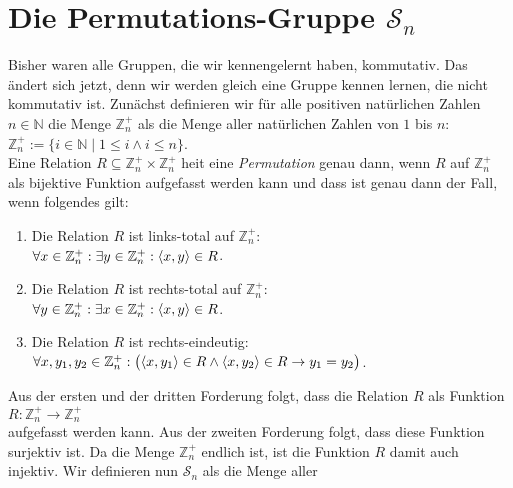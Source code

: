\section{Die Permutations-Gruppe $\mathcal{S}_n$}
Bisher waren alle Gruppen, die wir kennengelernt haben, kommutativ.  Das \"{a}ndert sich jetzt, denn wir
werden gleich eine Gruppe kennen lernen, die nicht kommutativ ist.  Zun\"{a}chst definieren wir f\"{u}r alle
positiven nat\"{u}rlichen Zahlen $n \in \mathbb{N}$ die Menge $\mathbb{Z}_n^+$ als die Menge aller nat\"{u}rlichen Zahlen
von $1$ bis $n$:
\\[0.2cm]
\hspace*{1.3cm}
$\mathbb{Z}_n^+ := \{ i \in \mathbb{N} \mid 1 \leq i \wedge i \leq n \}$.
\\[0.2cm]
Eine Relation $R \subseteq \mathbb{Z}_n^+ \times \mathbb{Z}_n^+$ hei\3t eine \emph{Permutation} genau dann, wenn $R$ auf $\mathbb{Z}_n^+$
als bijektive Funktion aufgefasst werden kann und dass ist genau dann der Fall, wenn folgendes gilt:
\begin{enumerate}
\item Die Relation $R$ ist links-total auf $\mathbb{Z}_n^+$:
      \\[0.2cm]
      \hspace*{1.3cm}
      $\forall x \in \mathbb{Z}_n^+: \exists y \in \mathbb{Z}_n^+: \pair(x,y) \in R$.
\item Die Relation $R$ ist rechts-total auf $\mathbb{Z}_n^+$:
      \\[0.2cm]
      \hspace*{1.3cm}
      $\forall y \in \mathbb{Z}_n^+: \exists x \in \mathbb{Z}_n^+: \pair(x,y) \in R$.
\item Die Relation $R$ ist rechts-eindeutig:
      \\[0.2cm]
      \hspace*{1.3cm}
      $\forall x, y_1, y_2 \in \mathbb{Z}_n^+:\bigl(\pair(x,y_1) \in R \wedge \pair(x,y_2) \in R \rightarrow y_1 = y_2\bigr)$.
\end{enumerate}
Aus der ersten und der dritten Forderung folgt, dass die Relation $R$ als Funktion
\\[0.2cm]
\hspace*{1.3cm} $R : \mathbb{Z}_n^+ \rightarrow \mathbb{Z}_n^+$
\\[0.2cm]
aufgefasst werden kann.  Aus der zweiten Forderung folgt, dass diese Funktion surjektiv ist.  Da die
Menge $\mathbb{Z}_n^+$ endlich ist, ist die Funktion $R$ damit auch injektiv.
Wir definieren nun $\mathcal{S}_n$ als die Menge aller
